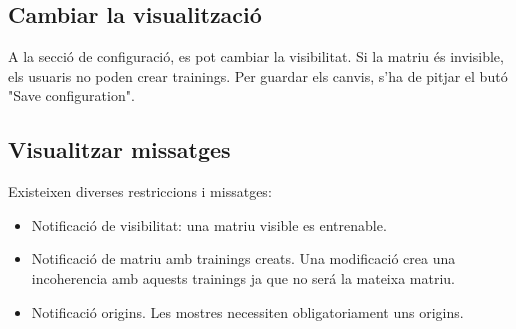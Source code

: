 \subsection{Cambiar la visualitzaci\'{o}}
A la secci\'{o} de configuraci\'{o}, es pot cambiar la visibilitat. Si la matriu \'{e}s invisible, els usuaris no poden crear trainings. Per guardar els canvis, s'ha de pitjar el but\'{o} "Save configuration".
\subsection{Visualitzar missatges}
Existeixen diverses restriccions i missatges:
\begin{itemize}
\item Notificaci\'{o} de visibilitat: una matriu visible es entrenable. 
\item Notificaci\'{o} de matriu amb trainings creats. Una modificaci\'{o} crea una incoherencia amb aquests trainings ja que no ser\'{a} la mateixa matriu.
\item Notificaci\'{o} origins. Les mostres necessiten obligatoriament uns origins.
\end{itemize}

